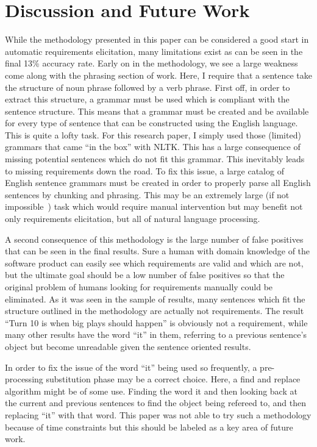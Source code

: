 \documentclass[conference]{IEEEtran}
\begin{document}
\section{Discussion and Future Work}

While the methodology presented in this paper can be considered a good start in automatic requirements elicitation, 
many limitations exist as can be seen in the final 13\% accuracy rate. Early on in the methodology, we see a large
weakness come along with the phrasing section of work. Here, I require that a sentence take the structure of noun
phrase followed by a verb phrase. First off, in order to extract this structure, a grammar must be used which is compliant with
the sentence structure. This means that a grammar must be created and be available for every type of sentence that
can be constructed using the English language. This is quite a lofty task. For this research paper, I simply used those
(limited) grammars that came ``in the box'' with NLTK. This has a large consequence of missing potential sentences
which do not fit this grammar. This inevitably leads to missing requirements down the road. To fix this issue, a large
catalog of English sentence grammars must be created in order to properly parse all English sentences by chunking and
phrasing. This may be an extremely large (if not impossible~\cite{shieber1985eac}) task which would require 
manual intervention but may benefit not only requirements
elicitation, but all of natural language processing.

A second consequence of this methodology is the large number of false positives that can be seen in the final results.
Sure a human with domain knowledge of the software product can easily see which requirements are valid and which are not,
but the ultimate goal should be a low number of false positives so that the original problem of humans looking for requirements
manually could be eliminated. As it was seen in the sample of results, many sentences which fit the structure outlined in
the methodology are actually not requirements. The result ``Turn 10 is when big plays should happen'' is obviously not
a requirement, while many other results have the word ``it'' in them, referring to a previous sentence's object but become
unreadable given the sentence oriented results.

In order to fix the issue of the word ``it'' being used so frequently, a pre-processing substitution phase may be a correct 
choice. Here, a find and replace algorithm might be of some use. Finding the word it and then looking back at the current and
previous sentences to find the  object being refereed to, and then replacing ``it'' with that word. This paper was not able
to try such a methodology because of time constraints but this should be labeled as a key area of future work.
\end{document}
